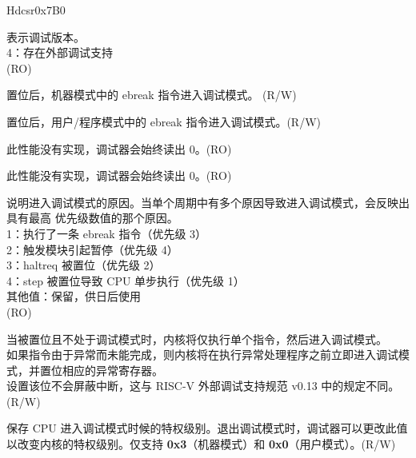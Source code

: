 
\begin{register}{H}{dcsr}{0x7B0}
\label{regdesc:DCSR}
%
%
%
%
%
%
%
%
%
%
%
%
\regnewline%
\begin{regdesc}
\begin{reglist}
\label{fielddesc:DCSRXEDBGVER}\item [xdebugver] 表示调试版本。\\
4：存在外部调试支持\\
(RO)
\label{fielddesc:DCSREBREAKM}\item [ebreakm] 置位后，机器模式中的 ebreak 指令进入调试模式。 (R/W)
\label{fielddesc:DCSREBREAKU}\item [ebreaku] 置位后，用户/程序模式中的 ebreak 指令进入调试模式。(R/W)
\label{fielddesc:DCSRSTOPCOUNT}\item [stopcount] 此性能没有实现，调试器会始终读出 0。(RO)
\label{fielddesc:DCSRSTOPTIME}\item [stoptime] 此性能没有实现，调试器会始终读出 0。(RO)
\label{fielddesc:DCSRCAUSE}\item [cause]  说明进入调试模式的原因。当单个周期中有多个原因导致进入调试模式，会反映出具有最高
优先级数值的那个原因。\\
1：执行了一条 ebreak 指令（优先级 3）\\
2：触发模块引起暂停（优先级 4）\\
3：haltreq 被置位（优先级 2）\\
4：step 被置位导致 CPU 单步执行（优先级 1）\\
其他值：保留，供日后使用\\
(RO)
\label{fielddesc:DCSRSTEP}\item [step] 当被置位且不处于调试模式时，内核将仅执行单个指令，然后进入调试模式。\\
如果指令由于异常而未能完成，则内核将在执行异常处理程序之前立即进入调试模式，并置位相应的异常寄存器。\\
设置该位不会屏蔽中断，这与 RISC-V 外部调试支持规范 v0.13 中的规定不同。\\
(R/W)
\label{fielddesc:DCSRPRV}\item [prv] 保存 CPU 进入调试模式时候的特权级别。退出调试模式时，调试器可以更改此值以改变内核的特权级别。仅支持 \textbf{0x3}（机器模式）和 \textbf{0x0}（用户模式）。(R/W)
\end{reglist}
\end{regdesc}
\end{register}

